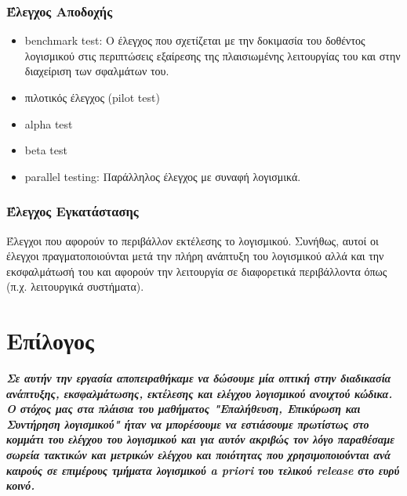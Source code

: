\documentclass[a4paper, 11pt]{article}
\begin{document}
{{\subsubsection{Έλεγχος Αποδοχής}
\begin{itemize}
\item \textlatin{benchmark test}: O έλεγχος που σχετίζεται με την δοκιμασία του δοθέντος λογισμικού στις περιπτώσεις εξαίρεσης της πλαισιωμένης λειτουργίας του και στην διαχείριση των σφαλμάτων του.
\item πιλοτικός έλεγχος (\textlatin{pilot test})
\item \textlatin{alpha test}
\item \textlatin{beta test}
\item \textlatin{parallel testing}: Παράλληλος έλεγχος με συναφή λογισμικά.
\end{itemize}

\subsubsection{Έλεγχος Εγκατάστασης}
Έλεγχοι που αφορούν το περιβάλλον εκτέλεσης το λογισμικού. Συνήθως, αυτοί οι έλεγχοι πραγματοποιούνται μετά την πλήρη ανάπτυξη του λογισμικού αλλά και την εκσφαλμάτωσή του και αφορούν την λειτουργία σε διαφορετικά περιβάλλοντα όπως (π.χ. λειτουργικά συστήματα).
\section{Επίλογος}
\textit{\textbf{Σε αυτήν την εργασία αποπειραθήκαμε να δώσουμε μία οπτική στην διαδικασία ανάπτυξης, εκσφαλμάτωσης, εκτέλεσης και ελέγχου λογισμικού ανοιχτού κώδικα. Ο στόχος μας στα πλάισια του μαθήματος "Επαλήθευση, Επικύρωση και Συντήρηση λογισμικού" ήταν να μπορέσουμε να εστιάσουμε πρωτίστως στο κομμάτι του ελέγχου του λογισμικού και για αυτόν ακριβώς τον λόγο παραθέσαμε σωρεία τακτικών και μετρικών ελέγχου και ποιότητας που χρησιμοποιούνται ανά καιρούς σε επιμέρους τμήματα λογισμικού \textlatin{a priori} του τελικού \textlatin{release} στο ευρύ κοινό.}}
}}
\end{document}
